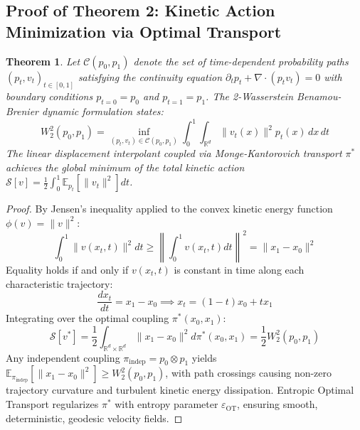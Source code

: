 \documentclass[10pt,journal,compsoc]{IEEEtran}
\newtheorem{theorem}{Theorem}
\begin{document}
\subsection{Proof of Theorem 2: Kinetic Action Minimization via Optimal Transport}
\begin{theorem}
Let $\mathcal{C}(p_0, p_1)$ denote the set of time-dependent probability paths $(p_t, v_t)_{t \in [0, 1]}$ satisfying the continuity equation $\partial_t p_t + \nabla \cdot (p_t v_t) = 0$ with boundary conditions $p_{t=0} = p_0$ and $p_{t=1} = p_1$. The 2-Wasserstein Benamou-Brenier dynamic formulation states:
\begin{equation}
W_2^2(p_0, p_1) = \inf_{(p_t, v_t) \in \mathcal{C}(p_0, p_1)} \int_0^1 \int_{\mathbb{R}^d} \|v_t(x)\|^2 p_t(x) \, dx \, dt
\end{equation}
The linear displacement interpolant coupled via Monge-Kantorovich transport $\pi^*$ achieves the global minimum of the total kinetic action $\mathcal{S}[v] = \frac{1}{2} \int_0^1 \mathbb{E}_{p_t} [\|v_t\|^2] dt$.
\end{theorem}

\begin{proof}
By Jensen's inequality applied to the convex kinetic energy function $\phi(v) = \|v\|^2$:
\begin{equation}
\int_0^1 \|v(x_t, t)\|^2 dt \ge \left\| \int_0^1 v(x_t, t) dt \right\|^2 = \|x_1 - x_0\|^2
\end{equation}
Equality holds if and only if $v(x_t, t)$ is constant in time along each characteristic trajectory:
\begin{equation}
\frac{d x_t}{dt} = x_1 - x_0 \implies x_t = (1 - t)x_0 + t x_1
\end{equation}
Integrating over the optimal coupling $\pi^*(x_0, x_1)$:
\begin{equation}
\mathcal{S}[v^*] = \frac{1}{2} \int_{\mathbb{R}^d \times \mathbb{R}^d} \|x_1 - x_0\|^2 d\pi^*(x_0, x_1) = \frac{1}{2} W_2^2(p_0, p_1)
\end{equation}
Any independent coupling $\pi_{\text{indep}} = p_0 \otimes p_1$ yields $\mathbb{E}_{\pi_{\text{indep}}}[\|x_1 - x_0\|^2] \ge W_2^2(p_0, p_1)$, with path crossings causing non-zero trajectory curvature and turbulent kinetic energy dissipation. Entropic Optimal Transport regularizes $\pi^*$ with entropy parameter $\varepsilon_{\text{OT}}$, ensuring smooth, deterministic, geodesic velocity fields.
\end{proof}
\end{document}
